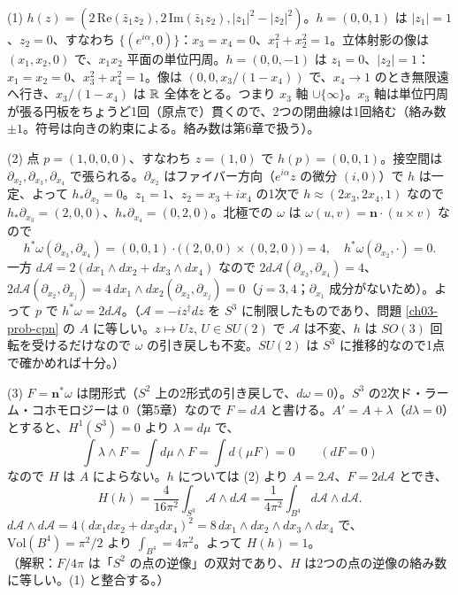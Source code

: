 \begin{solution}
(1) $h(z)=(2\,\mathrm{Re}(\bar z_1z_2),2\,\mathrm{Im}(\bar z_1z_2),\lvert z_1\rvert^2-\lvert z_2\rvert^2)$。$h=(0,0,1)$ は $\lvert z_1\rvert=1$、$z_2=0$、すなわち $\{(e^{i\alpha},0)\}$：$x_3=x_4=0$、$x_1^2+x_2^2=1$。立体射影の像は $(x_1,x_2,0)$ で、$x_1x_2$ 平面の単位円周。$h=(0,0,-1)$ は $z_1=0$、$\lvert z_2\rvert=1$：$x_1=x_2=0$、$x_3^2+x_4^2=1$。像は $(0,0,x_3/(1-x_4))$ で、$x_4\to1$ のとき無限遠へ行き、$x_3/(1-x_4)$ は $\mathbb{R}$ 全体をとる。つまり $x_3$ 軸 $\cup\{\infty\}$。$x_3$ 軸は単位円周が張る円板をちょうど1回（原点で）貫くので、2つの閉曲線は1回絡む（絡み数 $\pm1$。符号は向きの約束による。絡み数は第6章で扱う）。

(2) 点 $p=(1,0,0,0)$、すなわち $z=(1,0)$ で $h(p)=(0,0,1)$。接空間は $\partial_{x_2},\partial_{x_3},\partial_{x_4}$ で張られる。$\partial_{x_2}$ はファイバー方向（$e^{i\alpha}z$ の微分 $(i,0)$）で $h$ は一定、よって $h_*\partial_{x_2}=0$。$z_1=1$、$z_2=x_3+ix_4$ の1次で $h\approx(2x_3,2x_4,1)$ なので $h_*\partial_{x_3}=(2,0,0)$、$h_*\partial_{x_4}=(0,2,0)$。北極での $\omega$ は $\omega(u,v)=\bm n\cdot(u\times v)$ なので
\[
h^*\omega(\partial_{x_3},\partial_{x_4})=(0,0,1)\cdot\bigl((2,0,0)\times(0,2,0)\bigr)=4,\quad h^*\omega(\partial_{x_2},\cdot)=0 .
\]
一方 $d\mathcal A=2(dx_1\wedge dx_2+dx_3\wedge dx_4)$ なので $2d\mathcal A(\partial_{x_3},\partial_{x_4})=4$、$2d\mathcal A(\partial_{x_2},\partial_{x_j})=4\,dx_1\wedge dx_2(\partial_{x_2},\partial_{x_j})=0$（$j=3,4$；$\partial_{x_1}$ 成分がないため）。よって $p$ で $h^*\omega=2d\mathcal A$。（$\mathcal A=-iz^\dagger dz$ を $S^3$ に制限したものであり、問題 \ref{ch03-prob-cpn} の $A$ に等しい。$z\mapsto Uz$, $U\in SU(2)$ で $\mathcal A$ は不変、$h$ は $SO(3)$ 回転を受けるだけなので $\omega$ の引き戻しも不変。$SU(2)$ は $S^3$ に推移的なので1点で確かめれば十分。）

(3) $F=\bm n^*\omega$ は閉形式（$S^2$ 上の2形式の引き戻しで、$d\omega=0$）。$S^3$ の2次ド・ラーム・コホモロジーは $0$（第5章）なので $F=dA$ と書ける。$A'=A+\lambda$（$d\lambda=0$）とすると、$H^1(S^3)=0$ より $\lambda=d\mu$ で、
\[
\int\lambda\wedge F=\int d\mu\wedge F=\int d(\mu F)=0 \qquad(dF=0)
\]
なので $H$ は $A$ によらない。$h$ については (2) より $A=2\mathcal A$、$F=2d\mathcal A$ とでき、
\[
H(h)=\frac{4}{16\pi^2}\int_{S^3}\mathcal A\wedge d\mathcal A=\frac{1}{4\pi^2}\int_{B^4}d\mathcal A\wedge d\mathcal A .
\]
$d\mathcal A\wedge d\mathcal A=4(dx_1dx_2+dx_3dx_4)^2=8\,dx_1\wedge dx_2\wedge dx_3\wedge dx_4$ で、$\mathrm{Vol}(B^4)=\pi^2/2$ より $\int_{B^4}=4\pi^2$。よって $H(h)=1$。\\
（解釈：$F/4\pi$ は「$S^2$ の点の逆像」の双対であり、$H$ は2つの点の逆像の絡み数に等しい。(1) と整合する。）


\end{solution}
